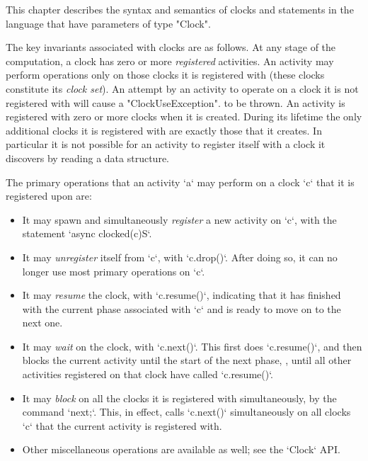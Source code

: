 This chapter describes the syntax and semantics of clocks and
statements in the language that have parameters of type \xcd"Clock". 

The key invariants associated with clocks are as follows.  At any
stage of the computation, a clock has zero or more {\em registered}
activities. An activity may perform operations only on those clocks it
is registered with (these clocks constitute its {\em clock set}). 
An attempt by an activity to operate on a clock it is not registered with
will cause a 
\xcd"ClockUseException". 
to be thrown.  
An activity is registered with zero or more clocks when it is created.
During its lifetime the only additional clocks it is registered with
are exactly those that it creates. In particular it is not possible
for an activity to register itself with a clock it discovers by
reading a data structure.

The primary operations that an activity \xcd`a` may perform on a clock \xcd`c`
that it is registered upon are: 
\begin{itemize}
\item It may spawn and simultaneously  {\em register} a new activity on
      \xcd`c`, with the statement       \xcd`async clocked(c){S}`.
\item It may {\em unregister} itself from \xcd`c`, with \xcd`c.drop()`.  After
      doing so, it can no longer use most primary operations on \xcd`c`.
\item It may {\em resume} the clock, with \xcd`c.resume()`, indicating that it
      has finished with the current phase associated with \xcd`c` and is ready
      to move on to the next one.
\item It may {\em wait} on the clock, with \xcd`c.next()`.  This first does
      \xcd`c.resume()`, and then blocks the current activity until the start
      of the next phase, \viz, until all other activities registered on that
      clock have called \xcd`c.resume()`.
\item It may {\em block} on all the clocks it is registered with
      simultaneously, by the command \xcd`next;`.  This, in effect, calls
      \xcd`c.next()` simultaneously 
      on all clocks \xcd`c` that the current activity is registered with.
\item Other miscellaneous operations are available as well; see the
      \xcd`Clock` API.
\end{itemize}

